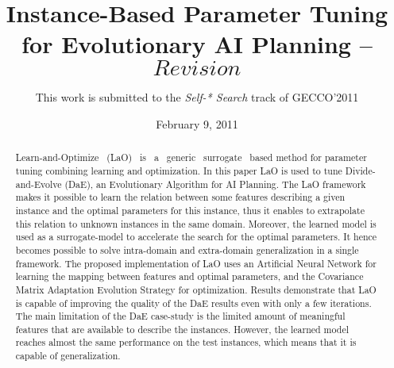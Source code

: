 \documentclass{MYsig-alternate}
\begin{document}
\title{Instance-Based Parameter Tuning\\
for Evolutionary AI Planning -- $Revision$}


\author{This work is submitted to the {\large \em Self-* Search} track of GECCO'2011}

% 

\date{February 9, 2011}
\maketitle
\begin{abstract}
\noindent Learn-and-Optimize ~(LaO) ~is ~a ~generic ~surrogate ~based method for parameter tuning combining learning and optimization. In this paper LaO is used to tune Divide-and-Evolve (DaE), an Evolutionary Algorithm for AI Planning. The LaO framework makes it possible to learn the relation between some features describing a given instance and the optimal parameters for this instance, thus it enables to extrapolate this relation to unknown instances in the same domain. Moreover, the learned model is used as a surrogate-model to accelerate the search for the optimal parameters. It hence becomes possible to solve intra-domain and extra-domain generalization in a single framework. The proposed implementation of LaO uses an Artificial Neural Network for learning the mapping between features and optimal parameters, and the Covariance Matrix Adaptation Evolution Strategy for optimization. Results demonstrate that LaO is capable of improving the quality of the DaE results even with only a few iterations. The main limitation of the DaE case-study is the limited amount of meaningful features that are available to describe the instances. However, the learned model reaches almost the same performance on the test instances, which means that it is capable of generalization. 

\end{abstract}
\end{document}
